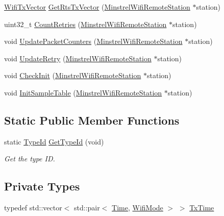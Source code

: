 \begin{DoxyCompactItemize}
\item 
\hyperlink{classns3_1_1WifiTxVector}{Wifi\+Tx\+Vector} \hyperlink{classns3_1_1MinstrelWifiManager_a8643a7d64b0cebcdba66207e36c2b1c6}{Get\+Rts\+Tx\+Vector} (\hyperlink{structns3_1_1MinstrelWifiRemoteStation}{Minstrel\+Wifi\+Remote\+Station} $\ast$station)
\item 
uint32\+\_\+t \hyperlink{classns3_1_1MinstrelWifiManager_af656a9f00fe648bdb8d5a758798a252f}{Count\+Retries} (\hyperlink{structns3_1_1MinstrelWifiRemoteStation}{Minstrel\+Wifi\+Remote\+Station} $\ast$station)
\item 
void \hyperlink{classns3_1_1MinstrelWifiManager_ac6a70510321a9f42af936e383c0e6865}{Update\+Packet\+Counters} (\hyperlink{structns3_1_1MinstrelWifiRemoteStation}{Minstrel\+Wifi\+Remote\+Station} $\ast$station)
\item 
void \hyperlink{classns3_1_1MinstrelWifiManager_af99109e3951c30e24f17519102959c81}{Update\+Retry} (\hyperlink{structns3_1_1MinstrelWifiRemoteStation}{Minstrel\+Wifi\+Remote\+Station} $\ast$station)
\item 
void \hyperlink{classns3_1_1MinstrelWifiManager_a5768fc5c0a32ee601e476d51b7cd8eec}{Check\+Init} (\hyperlink{structns3_1_1MinstrelWifiRemoteStation}{Minstrel\+Wifi\+Remote\+Station} $\ast$station)
\item 
void \hyperlink{classns3_1_1MinstrelWifiManager_ab873a0ab43bec476e589db6b260e2ee5}{Init\+Sample\+Table} (\hyperlink{structns3_1_1MinstrelWifiRemoteStation}{Minstrel\+Wifi\+Remote\+Station} $\ast$station)
\end{DoxyCompactItemize}
\subsection*{Static Public Member Functions}
\begin{DoxyCompactItemize}
\item 
static \hyperlink{classns3_1_1TypeId}{Type\+Id} \hyperlink{classns3_1_1MinstrelWifiManager_a8b141ec57751ef251c719c47d25c4961}{Get\+Type\+Id} (void)
\begin{DoxyCompactList}\small\item\em Get the type ID. \end{DoxyCompactList}\end{DoxyCompactItemize}
\subsection*{Private Types}
\begin{DoxyCompactItemize}
\item 
typedef std\+::vector$<$ std\+::pair$<$ \hyperlink{classns3_1_1Time}{Time}, \hyperlink{classns3_1_1WifiMode}{Wifi\+Mode} $>$ $>$ \hyperlink{classns3_1_1MinstrelWifiManager_a6130b5465b4427d329230812377e661c}{Tx\+Time}
\end{DoxyCompactItemize}
